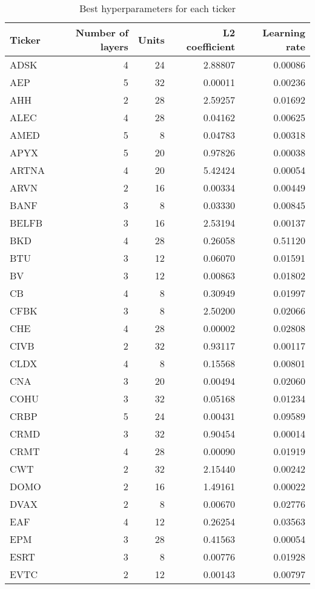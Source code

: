 \begin{table}[H]
\centering
\small
\caption{Best hyperparameters for each ticker}
\label{tab:appendix_C}
\begin{tabular}{lrrrr}
\toprule
Ticker & Number of layers & Units & L2 coefficient & Learning rate \\
\midrule
ADSK & 4 & 24 & 2.88807 & 0.00086 \\
AEP & 5 & 32 & 0.00011 & 0.00236 \\
AHH & 2 & 28 & 2.59257 & 0.01692 \\
ALEC & 4 & 28 & 0.04162 & 0.00625 \\
AMED & 5 & 8 & 0.04783 & 0.00318 \\
APYX & 5 & 20 & 0.97826 & 0.00038 \\
ARTNA & 4 & 20 & 5.42424 & 0.00054 \\
ARVN & 2 & 16 & 0.00334 & 0.00449 \\
BANF & 3 & 8 & 0.03330 & 0.00845 \\
BELFB & 3 & 16 & 2.53194 & 0.00137 \\
BKD & 4 & 28 & 0.26058 & 0.51120 \\
BTU & 3 & 12 & 0.06070 & 0.01591 \\
BV & 3 & 12 & 0.00863 & 0.01802 \\
CB & 4 & 8 & 0.30949 & 0.01997 \\
CFBK & 3 & 8 & 2.50200 & 0.02066 \\
CHE & 4 & 28 & 0.00002 & 0.02808 \\
CIVB & 2 & 32 & 0.93117 & 0.00117 \\
CLDX & 4 & 8 & 0.15568 & 0.00801 \\
CNA & 3 & 20 & 0.00494 & 0.02060 \\
COHU & 3 & 32 & 0.05168 & 0.01234 \\
CRBP & 5 & 24 & 0.00431 & 0.09589 \\
CRMD & 3 & 32 & 0.90454 & 0.00014 \\
CRMT & 4 & 28 & 0.00090 & 0.01919 \\
CWT & 2 & 32 & 2.15440 & 0.00242 \\
DOMO & 2 & 16 & 1.49161 & 0.00022 \\
DVAX & 2 & 8 & 0.00670 & 0.02776 \\
EAF & 4 & 12 & 0.26254 & 0.03563 \\
EPM & 3 & 28 & 0.41563 & 0.00054 \\
ESRT & 3 & 8 & 0.00776 & 0.01928 \\
EVTC & 2 & 12 & 0.00143 & 0.00797 \\

\end{tabular}
\end{table}
